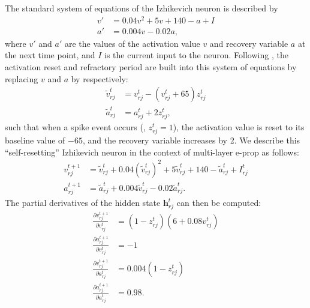 			The standard system of equations of the Izhikevich neuron is described by
			\begin{align}
			v' &= 0.04v^2 + 5v + 140 - a + I\\
			a' &= 0.004v - 0.02a,
			\end{align}
			where $v'$ and $a'$ are the values of the activation value $v$ and recovery variable $a$ at the next time point, and $I$ is the current input to the neuron.
			Following \citet{traub2020learning}, the activation reset and refractory period are built into this system of equations by replacing $v$ and $a$ by respectively:
			\begin{align}
			\tilde{v}^t_{rj} &= v^t_{rj} - \left(v^t_{rj} + 65\right)z^t_{rj}\\
			\tilde{a}^t_{rj} &= a^t_{rj} + 2z^t_{rj},
			\end{align}
			such that when a spike event occurs (\ie, $z^t_{rj} = 1$), the activation value is reset to its baseline value of $-65$, and the recovery variable increases by 2.
			We describe this ``self-resetting'' Izhikevich neuron in the context of multi-layer e-prop as follows:
			\begin{align}
			v^{t+1}_{rj} &= \tilde{v}^t_{rj} + 0.04\left(\tilde{v}^t_{rj}\right)^2 + 5\tilde{v}^t_{rj} + 140 - \tilde{a}^t_{rj} + I^t_{rj}\\
			a^{t+1}_{rj} &= \tilde{a}^t_{rj} + 0.004\tilde{v}^t_{rj}-0.02\tilde{a}^t_{rj}.
			\end{align}
			The partial derivatives of the hidden state $\mathbf{h}^t_{rj}$ can then be computed:
			\begin{align}
			\frac{\partial v^{t+1}_{rj}}{\partial v^t_{rj}} &= \left(1-z^t_{rj}\right)\left(6+0.08v^t_{rj}\right)\\
			\frac{\partial a^{t+1}_{rj}}{\partial v^t_{rj}} &= -1\\
			\frac{\partial v^{t+1}_{rj}}{\partial a^t_{rj}} &= 0.004\left(1-z^t_{rj}\right)\\
			\frac{\partial a^{t+1}_{rj}}{\partial a^t_{rj}} &= 0.98.
			\end{align}

